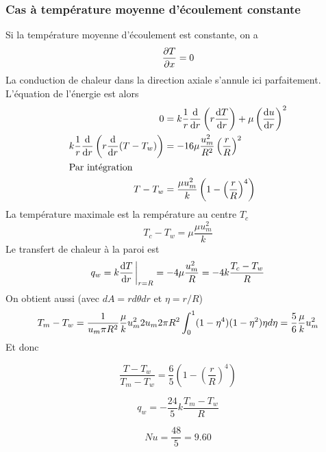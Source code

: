       \subsubsection{Cas à température moyenne d'écoulement constante}
        Si la température moyenne d'écoulement est constante, on a
        \begin{equation}
          \pdv{T}{x} = 0
        \end{equation}
        La conduction de chaleur dans la direction axiale s'annule ici parfaitement. L'équation de l'énergie est alors
        \begin{align}
          0 &= k \frac{1}{r} \dv{r}\left(r\dv{T}{r}\right) + \mu \left(\dv{u}{r}\right)^2\\
          k \frac{1}{r} \dv{r}\left(r\dv{r}(T-T_w)\right) &= - 16\mu \frac{u_m^2}{R^2} \left(\frac{r}{R}\right)^2 \\ \intertext{Par intégration}
          T-T_w &= \frac{\mu u_m^2}{k} \left(1-\left(\frac{r}{R}\right)^4\right)
        \end{align}
        La température maximale est la rempérature au centre $T_c$
        \begin{equation}
          T_c - T_w = \mu \frac{\mu u_m^2}{k}
        \end{equation}
        Le transfert de chaleur à la paroi est
        \begin{equation}
          q_w = k \dv{T}{r}\eval_{r=R} = -4\mu \frac{u_m^2}{R} = -4k \frac{T_c - T_w}{R}
        \end{equation}
        On obtient aussi (avec $dA = rd\theta dr$ et $\eta = r/R$)
        \begin{equation}
          T_m - T_w = \frac{1}{u_m \pi R^2} \frac{\mu}{k} u_m^2 2 u_m 2\pi R^2 \int_0^1(1-\eta^4)(1-\eta^2) \eta d\eta = \frac{5}{6} \frac{\mu}{k} u_m^2
        \end{equation}
        Et donc
        \begin{multicols}{3}
          \begin{equation}
              \frac{T-T_w}{T_m - T_w} = \frac{6}{5} \left(1 - \left(\frac{r}{R}\right)^4\right) \nonumber
          \end{equation}

          \begin{equation}
            q_w = -\frac{24}{5}k\frac{T_m - T_w}{R} \nonumber
          \end{equation}

          \begin{equation}
            Nu = \frac{48}{5} = 9.60
          \end{equation}
        \end{multicols}

